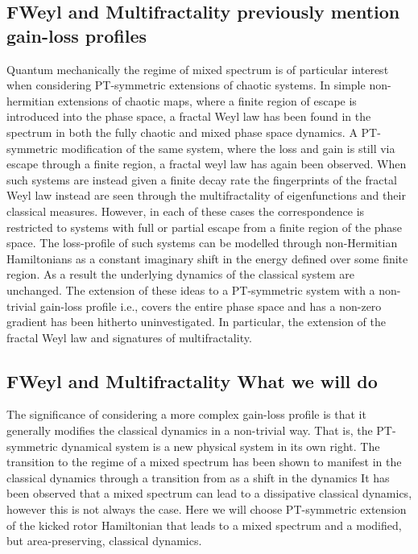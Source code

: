 \documentclass{iopart}
\begin{document}
	\subsection{FWeyl and Multifractality previously mention gain-loss profiles}
	Quantum mechanically the regime of mixed spectrum is of particular interest when considering PT-symmetric extensions of chaotic systems. In simple non-hermitian extensions of chaotic maps, where a finite region of escape is introduced into the phase space, a fractal Weyl law has been found in the spectrum in both the fully chaotic and mixed phase space dynamics. A PT-symmetric modification of the same system, where the loss and gain is still via escape through a finite region, a fractal weyl law has again been observed. When such systems are instead given a finite decay rate the fingerprints of the fractal Weyl law instead are seen through the multifractality of eigenfunctions and their classical measures. However, in each of these cases the correspondence is restricted to systems with full or partial escape from a finite region of the phase space. The loss-profile of such systems can be modelled through non-Hermitian Hamiltonians as a constant imaginary shift in the energy defined over some finite region. As a result the underlying dynamics of the classical system are unchanged. The extension of these ideas to a PT-symmetric system with a non-trivial gain-loss profile i.e., covers the entire phase space and has a non-zero gradient has been hitherto uninvestigated. In particular, the extension of the fractal Weyl law and signatures of multifractality.
	\subsection{FWeyl and Multifractality What we will do}
	The significance of considering a more complex gain-loss profile is that it generally modifies the classical dynamics in a non-trivial way. That is, the PT-symmetric dynamical system is a new physical system in its own right. The transition to the regime of a mixed spectrum has been shown to manifest in the classical dynamics through a transition from as a shift in the dynamics  It has been observed that a mixed spectrum can lead to a dissipative classical dynamics, however this is not always the case. Here we will choose PT-symmetric extension of the kicked rotor Hamiltonian that leads to a mixed spectrum and a modified, but area-preserving, classical dynamics. 
\end{document}
